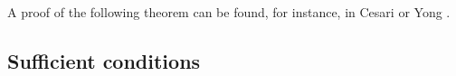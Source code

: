 A proof of the following theorem can be found, for instance, in Cesari \cite[Theorem 5.1.i]{Cesari83} or Yong \cite[Theorem 2.3.1]{Yong2015}.






\subsection{Sufficient conditions}







